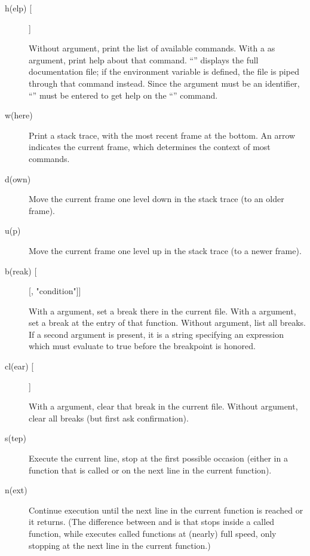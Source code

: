 \begin{description}

\item[h(elp) []]

Without argument, print the list of available commands.
With a  as argument, print help about that command.
``'' displays the full documentation file; if the
environment variable  is defined, the file is piped
through that command instead.  Since the  argument must be
an identifier, ``'' must be entered to get help on the
``\code{!}'' command.

\item[w(here)]

Print a stack trace, with the most recent frame at the bottom.
An arrow indicates the current frame, which determines the
context of most commands.

\item[d(own)]

Move the current frame one level down in the stack trace
(to an older frame).

\item[u(p)]

Move the current frame one level up in the stack trace
(to a newer frame).

\item[b(reak) [\code{|}] [, "condition"]]

With a  argument, set a break there in the current
file.  With a  argument, set a break at the entry of
that function.  Without argument, list all breaks.
If a second argument is present, it is a string specifying an
expression which must evaluate to true before the breakpoint is
honored.

\item[cl(ear) []]

With a  argument, clear that break in the current file.
Without argument, clear all breaks (but first ask confirmation).

\item[s(tep)]

Execute the current line, stop at the first possible occasion
(either in a function that is called or on the next line in the
current function).

\item[n(ext)]

Continue execution until the next line in the current function
is reached or it returns.  (The difference between  and
 is that  stops inside a called function, while
 executes called functions at (nearly) full speed, only
stopping at the next line in the current function.)


\end{description}
